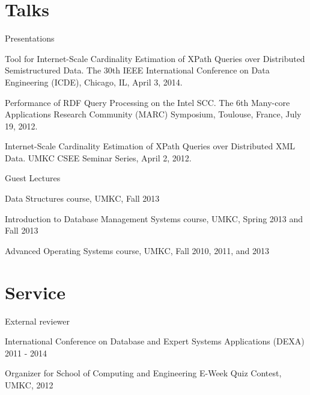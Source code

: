 \documentclass[margin,line]{resume}
\begin{document}
\begin{resume}

\newpage
    \section{\mysidestyle Talks}
    \begin{list2}
    \item Presentations
    \begin{list3}
    \item Tool for Internet-Scale Cardinality Estimation of XPath Queries over Distributed Semistructured Data. The 30th IEEE International Conference on Data Engineering (ICDE), Chicago, IL, April 3, 2014.
    \item Performance of RDF Query Processing on the Intel SCC. The 6th Many-core Applications Research Community (MARC) Symposium, Toulouse, France, July 19, 2012.
    \item Internet-Scale Cardinality Estimation of XPath Queries over Distributed XML Data. UMKC CSEE Seminar Series, April 2, 2012.
    \end{list3}
    \item Guest Lectures
    \begin{list3}
    \item Data Structures course, UMKC, Fall 2013
    \item Introduction to Database Management Systems course, UMKC, Spring 2013 and Fall 2013
    \item Advanced Operating Systems course, UMKC, Fall 2010, 2011, and 2013
    \end{list3}
    \end{list2}

    \section{\mysidestyle Service}
    \begin{list2}
    \item External reviewer
    \begin{list3}
    \item International Conference on Database and Expert Systems Applications (DEXA) 2011 - 2014
    \end{list3}
    \item Organizer for School of Computing and Engineering E-Week Quiz Contest, UMKC, 2012
    \end{list2}
 
\end{resume}
\end{document}
